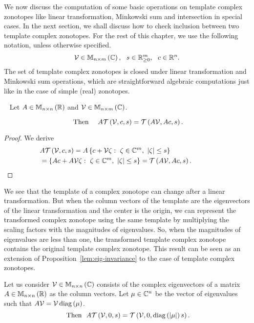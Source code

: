 We now discuss the computation of some basic operations on template
complex zonotopes like linear transformation, Minkowski sum and
intersection in special cases.  In the next section, we shall discuss
how to check inclusion between two template complex zonotopes.  For
the rest of this chapter, we use the following notation, unless
otherwise specified.
%
\begin{align*}
\mathcal{V}\in\mathbb{M}_{n\times m}\left(\mathbb{C}\right),~~s\in\mathbb{R}^m_{\geq 0},~~c\in\mathbb{R}^n.
\end{align*}
%
The set of template complex zonotopes is closed under linear transformation and
{Minkowski sum} operations, which are straightforward algebraic
computations just like in the case of simple (real) zonotopes.
%
\begin{lemma}~\label{lem:lin-transform}
Let $A\in\mathbb{M}_{n\times n}\left(\mathbb{R}\right)$ and $\mathcal{V}\in\mathbb{M}_{n\times m}\left(\mathbb{C}\right)$.

%
\begin{equation*}~\label{eqn:lin-transform}
\text{Then}~~~~A\mathit{\operatorname{\mathcal{T}}}\left(\mathcal{V},c,s\right)=\mathit{\operatorname{\mathcal{T}}}\left(A\mathcal{V},Ac,s\right).
\end{equation*}
%
\end{lemma}
%
\begin{proof}
  We derive
  \begin{align*}
&
    A\mathit{\operatorname{\mathcal{T}}}\left(\mathcal{V},c,s\right)=A\left\{c+\mathcal{V}\zeta:~\zeta\in\mathbb{C}^m,~\left|\zeta\right|\leq
    s\right\}\\
    & =\left\{Ac+A\mathcal{V}\zeta:~\zeta\in\mathbb{C}^m,~\left|\zeta\right|\leq
    s\right\}=\mathit{\operatorname{\mathcal{T}}}\left(A\mathcal{V},Ac,s\right).~\hspace{3em}\qedhere
  \end{align*}
\end{proof}
%
We see that the template of a complex zonotope can change after a
linear transformation.  But when the column vectors of the template
are the eigenvectors of the linear transformation and the center is
the origin, we can represent the transformed complex zonotope using
the same template by multiplying the scaling factors with the
magnitudes of eigenvalues.  So, when the magnitudes of eigenvalues are
less than one, the transformed template complex zonotope contains the
original template complex zonotope.  This result can be seen as an
extension of Proposition~\ref{lem:eig-invariance} to the case of
template complex zonotopes.
%
\begin{proposition}
Let us consider $\mathcal{V}\in\mathbb{M}_{n\times n}\left(\mathbb{C}\right)$ consists of the complex
eigenvectors of a matrix $A\in\mathbb{M}_{n\times n}\left(\mathbb{R}\right)$ as the column vectors.
Let $\mu\in\mathbb{C}^n$ be the vector of eigenvalues such that
$A\mathcal{V}=\mathcal{V}\operatorname{diag}\left(\mu\right)$.
%
\begin{equation}~\label{eqn:eigen-scaling}
\text{Then}~~A\mathit{\operatorname{\mathcal{T}}}\left(\mathcal{V},0,s\right)=\mathit{\operatorname{\mathcal{T}}}\left(\mathcal{V},0,\operatorname{diag}\left(\left|\mu\right|\right)s\right).
\end{equation}
%
\end{proposition}
